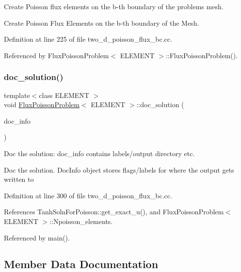 Create Poisson flux elements on the b-\/th boundary of the problem\textquotesingle{}s mesh. 

Create Poisson Flux Elements on the b-\/th boundary of the Mesh. 

Definition at line 225 of file two\+\_\+d\+\_\+poisson\+\_\+flux\+\_\+bc.\+cc.



Referenced by Flux\+Poisson\+Problem$<$ E\+L\+E\+M\+E\+N\+T $>$\+::\+Flux\+Poisson\+Problem().

\mbox{\label{classFluxPoissonProblem_ae410950b9dc1f2bd4991480df15a1586}} 
\subsubsection{\texorpdfstring{doc\+\_\+solution()}{doc\_solution()}}
{\footnotesize\ttfamily template$<$class E\+L\+E\+M\+E\+NT $>$ \\
void \hyperlink{classFluxPoissonProblem}{Flux\+Poisson\+Problem}$<$ E\+L\+E\+M\+E\+NT $>$\+::doc\+\_\+solution (\begin{DoxyParamCaption}\item[{Doc\+Info \&}]{doc\+\_\+info }\end{DoxyParamCaption})}



Doc the solution\+: doc\+\_\+info contains labels/output directory etc. 

Doc the solution. Doc\+Info object stores flags/labels for where the output gets written to 

Definition at line 300 of file two\+\_\+d\+\_\+poisson\+\_\+flux\+\_\+bc.\+cc.



References Tanh\+Soln\+For\+Poisson\+::get\+\_\+exact\+\_\+u(), and Flux\+Poisson\+Problem$<$ E\+L\+E\+M\+E\+N\+T $>$\+::\+Npoisson\+\_\+elements.



Referenced by main().



\subsection{Member Data Documentation}
\mbox{\label{classFluxPoissonProblem_a1ee0cfcbc307252430a3a5ba7ab7fd6e}} 
